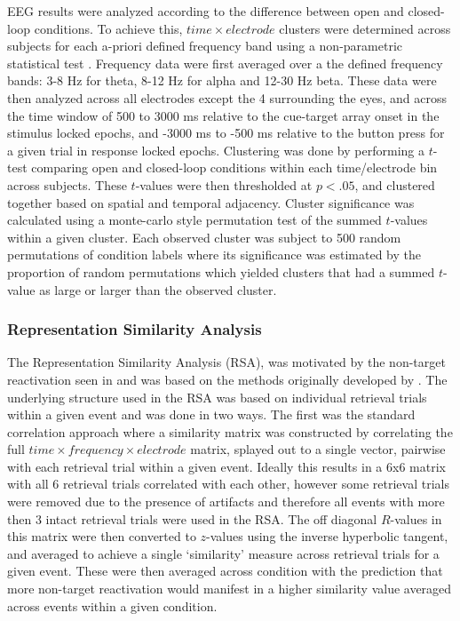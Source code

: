\documentclass[11pt, titlepage, twoside]{article}
\begin{document}
EEG results were analyzed according to the difference between open and closed-loop conditions.  To achieve this, $time \times electrode$ clusters were determined across subjects for each a-priori defined frequency band using a non-parametric statistical test \cite{MarisOostenveld07}.  Frequency data were first averaged over a the defined frequency bands: 3-8 Hz for theta, 8-12 Hz for alpha and 12-30 Hz beta.  These data were then analyzed across all electrodes except the 4 surrounding the eyes, and across the time window of 500 to 3000 ms relative to the cue-target array onset in the stimulus locked epochs, and -3000 ms to -500 ms relative to the button press for a given trial in response locked epochs.  Clustering was done by performing a $t$-test comparing open and closed-loop conditions within each time/electrode bin across subjects.  These $t$-values were then thresholded at $p<.05$, and clustered together based on spatial and temporal adjacency.   Cluster significance was calculated using a monte-carlo style permutation test of the summed $t$-values within a given cluster.  Each observed cluster was subject to 500 random permutations of condition labels where its significance was estimated by the proportion of random permutations which yielded clusters that had a summed $t$-value as large or larger than the observed cluster.

\subsubsection{Representation Similarity Analysis}
\label{sec:deevRSA}
The Representation Similarity Analysis (RSA), was motivated by the non-target reactivation seen in \textcite{HornerBisbyBushEtAl15} and was based on the methods originally developed by \textcite{KriegeskorteMurBandettini08}.  The underlying structure used in the RSA was based on individual retrieval trials within a given event and was done in two ways.  The first was the standard correlation approach where a similarity matrix was constructed by correlating the full $time \times frequency \times electrode$ matrix, splayed out to a single vector, pairwise with each retrieval trial within a given event.  Ideally this results in a 6x6 matrix with all 6 retrieval trials correlated with each other, however some retrieval trials were removed due to the presence of artifacts and therefore all events with more then 3 intact retrieval trials were used in the RSA.  The off diagonal $R$-values in this matrix were then converted to $z$-values using the inverse hyperbolic tangent, and averaged to achieve a single `similarity' measure across retrieval trials for a given event.  These were then averaged across condition with the prediction that more non-target reactivation would manifest in a higher similarity value averaged across events within a given condition.
\end{document}
